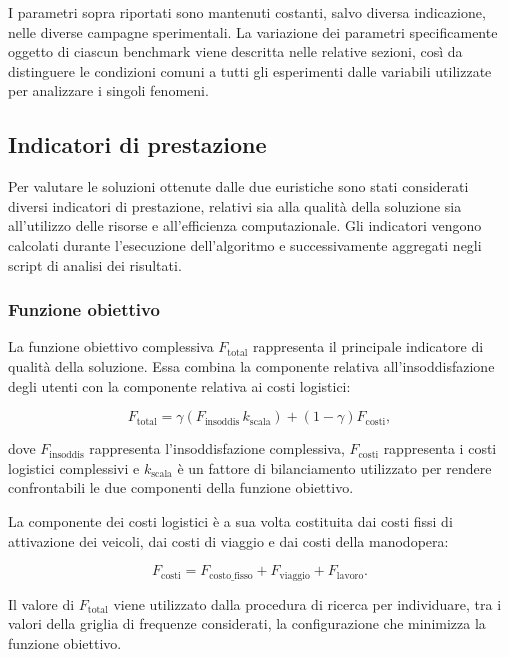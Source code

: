 I parametri sopra riportati sono mantenuti costanti, salvo diversa indicazione, nelle diverse campagne sperimentali. La variazione dei parametri specificamente oggetto di ciascun benchmark viene descritta nelle relative sezioni, così da distinguere le condizioni comuni a tutti gli esperimenti dalle variabili utilizzate per analizzare i singoli fenomeni.






\subsection{Indicatori di prestazione}

Per valutare le soluzioni ottenute dalle due euristiche sono stati considerati diversi indicatori di prestazione, relativi sia alla qualità della soluzione sia all'utilizzo delle risorse e all'efficienza computazionale. Gli indicatori vengono calcolati durante l'esecuzione dell'algoritmo e successivamente aggregati negli script di analisi dei risultati.

\subsubsection{Funzione obiettivo}

La funzione obiettivo complessiva $F_{\mathrm{total}}$ rappresenta il principale indicatore di qualità della soluzione. Essa combina la componente relativa all'insoddisfazione degli utenti con la componente relativa ai costi logistici:

\[
F_{\mathrm{total}}
=
\gamma \left(F_{\mathrm{insoddis}}\, k_{\mathrm{scala}}\right)
+
(1-\gamma)F_{\mathrm{costi}},
\]

dove $F_{\mathrm{insoddis}}$ rappresenta l'insoddisfazione complessiva, $F_{\mathrm{costi}}$ rappresenta i costi logistici complessivi e $k_{\mathrm{scala}}$ è un fattore di bilanciamento utilizzato per rendere confrontabili le due componenti della funzione obiettivo.

La componente dei costi logistici è a sua volta costituita dai costi fissi di attivazione dei veicoli, dai costi di viaggio e dai costi della manodopera:

\[
F_{\mathrm{costi}}
=
F_{\mathrm{costo\_fisso}}
+
F_{\mathrm{viaggio}}
+
F_{\mathrm{lavoro}}.
\]

Il valore di $F_{\mathrm{total}}$ viene utilizzato dalla procedura di ricerca per individuare, tra i valori della griglia di frequenze considerati, la configurazione che minimizza la funzione obiettivo.

